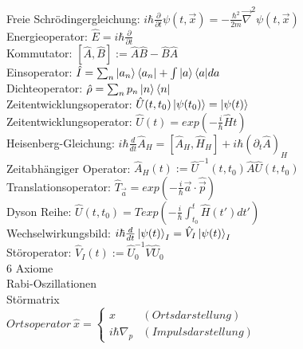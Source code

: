 \documentclass{article}
\begin{document}
Freie Schr\"odingergleichung: $i \hbar \frac{\partial}{\partial t} \psi(t, \vec{x}) = -\frac{\hbar^2}{2m}\vec{\nabla}^2\psi(t, \vec{x}) $ \\

Energieoperator: $\hat{E} = i \hbar \frac{\partial}{\partial t} $ \\

Kommutator: $[\hat{A}, \hat{B}] := \hat{A}\hat{B} - \hat{B}\hat{A}$ \\

Einsoperator: $\hat{I}=\sum_n{\ket{a_n}\bra{a_n}} + \int{\ket{a}\bra{a}}da$ \\

Dichteoperator: $\hat{\rho}=\sum_n{p_n \ket{n}\bra{n}}$ \\

Zeitentwicklungsoperator: $\hat{U}(t, t_0)\ket{\psi(t_0)} = \ket{\psi(t)}$ \\

Zeitentwicklungsoperator: $\hat{U}(t) = exp(-\frac{i}{\hbar}\hat{H}t) $ \\

Heisenberg-Gleichung: $i \hbar \frac{d}{dt} \hat{A}_H = \left[ \hat{A}_H, \hat{H}_H \right] + i \hbar \left( \partial_t \hat{A} \right)_H $\\

Zeitabh\"angiger Operator: $\hat{A}_H(t) := \hat{U}^{-1}(t, t_0) \hat{A} \hat{U}(t, t_0)$ \\

Translationsoperator: $\hat{T}_{\vec{a}} = exp \left( - \frac{i}{\hbar} \vec{a} \cdot \hat{\vec{p}} \right)$ \\

Dyson Reihe:  $\hat{U}(t, t_0) = T exp\left(-\frac{i}{\hbar} \int_{t_0}^t{\hat{H}(t')}dt' \right)$ \\

Wechselwirkungsbild:  $i \hbar \frac{d}{dt} \ket{\psi(t)}_I = \hat{V}_I \ket{\psi(t)}_I$ \\

St\"oroperator: $\hat{V}_I(t) := \hat{U}_0^{-1} \hat{V} \hat{U}_0$ \\

6 Axiome \\ 

Rabi-Oszillationen \\

St\"ormatrix \\

$Ortsoperator\ \hat{x}=\left\{\begin{array}{ll} 
x & (Ortsdarstellung) \\
i \hbar \nabla_p & (Impulsdarstellung)
\end{array}\right.$ \\
\end{document}
